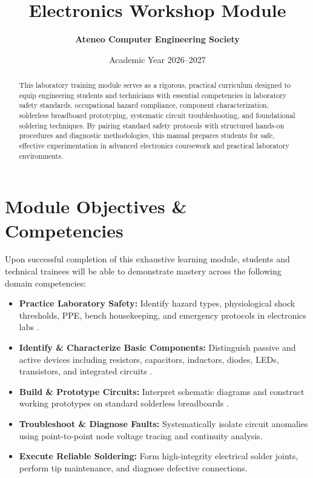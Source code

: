 \documentclass[11pt, a4paper]{report}
\title{
    \vspace{-1.5cm}
    \textbf{\Huge Electronics Workshop Module}
}
\author{\textbf{Ateneo Computer Engineering Society}}
\date{Academic Year 2026--2027}
\begin{document}
\maketitle

\begin{abstract}
This laboratory training module serves as a rigorous, practical curriculum designed to equip engineering students and technicians with essential competencies in laboratory safety standards, occupational hazard compliance, component characterization, solderless breadboard prototyping, systematic circuit troubleshooting, and foundational soldering techniques. By pairing standard safety protocols with structured hands-on procedures and diagnostic methodologies, this manual prepares students for safe, effective experimentation in advanced electronics coursework and practical laboratory environments.
\end{abstract}

\vspace{1em}
\section*{Module Objectives \& Competencies}
Upon successful completion of this exhaustive learning module, students and technical trainees will be able to demonstrate mastery across the following domain competencies:
\begin{itemize}[leftmargin=1.5em]
    \item \textbf{Practice Laboratory Safety:} Identify hazard types, physiological shock thresholds, PPE, bench housekeeping, and emergency protocols in electronics labs \cite{yildiz2010approach, bicol_university_safety}.
    \item \textbf{Identify \& Characterize Basic Components:} Distinguish passive and active devices including resistors, capacitors, inductors, diodes, LEDs, transistors, and integrated circuits \cite{seymour_components, kalyanaraman_circuits}.
    \item \textbf{Build \& Prototype Circuits:} Interpret schematic diagrams and construct working prototypes on standard solderless breadboards \cite{sparkfun_breadboard}.
    \item \textbf{Troubleshoot \& Diagnose Faults:} Systematically isolate circuit anomalies using point-to-point node voltage tracing and continuity analysis.
    \item \textbf{Execute Reliable Soldering:} Form high-integrity electrical solder joints, perform tip maintenance, and diagnose defective connections.
\end{itemize}
\end{document}
